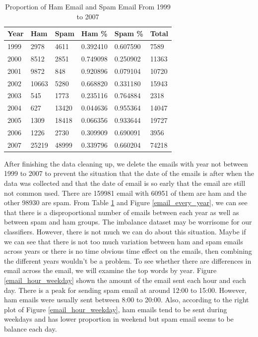 \begin{table}[h]
\centering
\caption{Proportion of Ham Email and Spam Email From 1999 to 2007}
\label{proportion_ham_spam}
\begin{tabular}{@{}llllll@{}}
\toprule
Year & Ham   & Spam  & Ham \%   & Spam \%  & Total \\ \midrule
1999 & 2978  & 4611  & 0.392410 & 0.607590 & 7589  \\
2000 & 8512  & 2851  & 0.749098 & 0.250902 & 11363 \\
2001 & 9872  & 848   & 0.920896 & 0.079104 & 10720 \\
2002 & 10663 & 5280  & 0.668820 & 0.331180 & 15943 \\
2003 & 545   & 1773  & 0.235116 & 0.764884 & 2318  \\
2004 & 627   & 13420 & 0.044636 & 0.955364 & 14047 \\
2005 & 1309  & 18418 & 0.066356 & 0.933644 & 19727 \\
2006 & 1226  & 2730  & 0.309909 & 0.690091 & 3956  \\
2007 & 25219 & 48999 & 0.339796 & 0.660204 & 74218 \\ \bottomrule
\end{tabular}
\end{table}

After finishing the data cleaning up, we delete the emails with year not between 1999 to 2007 to prevent the situation that the date of the emails is after when the data was collected and that the date of email is so early that the email are still not common used. There are 159981 email with 60951 of them are ham and the other 98930 are spam. From Table \ref{proportion_ham_spam} and Figure \ref{email_every_year}, we can see that there is a disproportional number of emails between each year as well as between spam and ham groups. The imbalance dataset may be worrisome for our classifiers. However, there is not much we can do about this situation. Maybe if we can see that there is not too much variation between ham and spam emails across years or there is no time obvious time effect on the emails, then combining the different years wouldn't be a problem. To see whether there are differences in email across the email, we will examine the top words by year. Figure \ref{email_hour_weekday} shown the amount of the email sent each hour and each day. There is a peak for sending spam email at around 12:00 to 15:00. However, ham emails were usually sent between 8:00 to 20:00. Also, according to the right plot of Figure \ref{email_hour_weekday}, ham emails tend to be sent during weekdays and has lower proportion in weekend but spam email seems to be balance each day.\\


